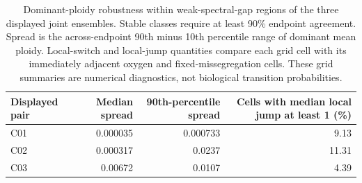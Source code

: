 \begin{table}[!htbp]
\centering
\scriptsize
\setlength{\tabcolsep}{3.6pt}
\caption{Dominant-ploidy robustness within weak-spectral-gap regions of the three displayed joint ensembles. Stable classes require at least 90\% endpoint agreement. Spread is the across-endpoint 90th minus 10th percentile range of dominant mean ploidy. Local-switch and local-jump quantities compare each grid cell with its immediately adjacent oxygen and fixed-missegregation cells. These grid summaries are numerical diagnostics, not biological transition probabilities.}
\label{tab:weak_gap_summary}

\vspace{0.8em}
\begin{tabular}{@{}lrrr@{}}
\toprule
Displayed pair & Median spread & 90th-percentile spread & Cells with median local jump at least 1 (\%) \\
\midrule
C01 & 0.000035 & 0.000733 & 9.13 \\
C02 & 0.000317 & 0.0237 & 11.31 \\
C03 & 0.00672 & 0.0107 & 4.39 \\
\bottomrule
\end{tabular}
\end{table}
